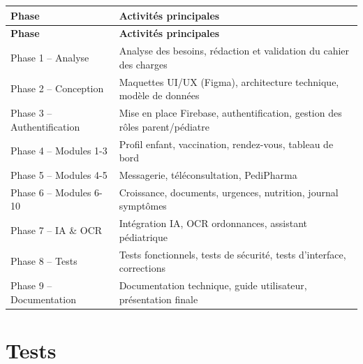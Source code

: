 \documentclass[11pt,a4paper]{article}
\newcommand{\headrow}{\rowcolor{navy}}
\newcommand{\tblhead}[1]{\color{white}\textbf{#1}}
\begin{document}
\renewcommand{\arraystretch}{1.4}
\begin{longtable}{|p{5cm}|p{9cm}|}
\hline
\headrow \tblhead{Phase} & \tblhead{Activités principales} \\
\hline
\endfirsthead
\hline
\headrow \tblhead{Phase} & \tblhead{Activités principales} \\
\hline
\endhead
Phase 1 -- Analyse & Analyse des besoins, rédaction et validation du cahier des charges \\
\hline
\rowcolor{rowgrey}
Phase 2 -- Conception & Maquettes UI/UX (Figma), architecture technique, modèle de données \\
\hline
Phase 3 -- Authentification & Mise en place Firebase, authentification, gestion des rôles parent/pédiatre \\
\hline
\rowcolor{rowgrey}
Phase 4 -- Modules 1-3 & Profil enfant, vaccination, rendez-vous, tableau de bord \\
\hline
Phase 5 -- Modules 4-5 & Messagerie, téléconsultation, PediPharma \\
\hline
\rowcolor{rowgrey}
Phase 6 -- Modules 6-10 & Croissance, documents, urgences, nutrition, journal symptômes \\
\hline
Phase 7 -- IA \& OCR & Intégration IA, OCR ordonnances, assistant pédiatrique \\
\hline
\rowcolor{rowgrey}
Phase 8 -- Tests & Tests fonctionnels, tests de sécurité, tests d'interface, corrections \\
\hline
Phase 9 -- Documentation & Documentation technique, guide utilisateur, présentation finale \\
\hline
\end{longtable}

\section{Tests}
\end{document}
